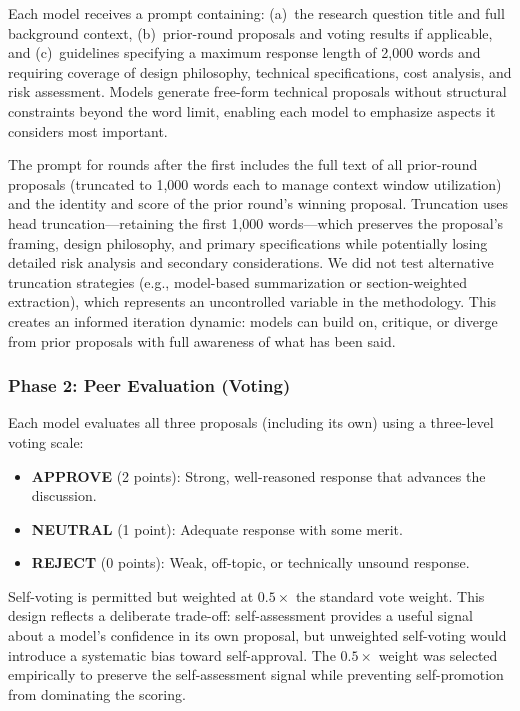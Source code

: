 \documentclass[11pt,a4paper]{article}
\begin{document}
Each model receives a prompt containing: (a)~the research question title and full background context, (b)~prior-round proposals and voting results if applicable, and (c)~guidelines specifying a maximum response length of 2{,}000 words and requiring coverage of design philosophy, technical specifications, cost analysis, and risk assessment. Models generate free-form technical proposals without structural constraints beyond the word limit, enabling each model to emphasize aspects it considers most important.

The prompt for rounds after the first includes the full text of all prior-round proposals (truncated to 1{,}000 words each to manage context window utilization) and the identity and score of the prior round's winning proposal. Truncation uses head truncation---retaining the first 1{,}000 words---which preserves the proposal's framing, design philosophy, and primary specifications while potentially losing detailed risk analysis and secondary considerations. We did not test alternative truncation strategies (e.g., model-based summarization or section-weighted extraction), which represents an uncontrolled variable in the methodology. This creates an informed iteration dynamic: models can build on, critique, or diverge from prior proposals with full awareness of what has been said.

\subsubsection{Phase 2: Peer Evaluation (Voting)}

Each model evaluates all three proposals (including its own) using a three-level voting scale:

\begin{itemize}[nosep]
    \item \textbf{APPROVE} (2 points): Strong, well-reasoned response that advances the discussion.
    \item \textbf{NEUTRAL} (1 point): Adequate response with some merit.
    \item \textbf{REJECT} (0 points): Weak, off-topic, or technically unsound response.
\end{itemize}

Self-voting is permitted but weighted at $0.5\times$ the standard vote weight. This design reflects a deliberate trade-off: self-assessment provides a useful signal about a model's confidence in its own proposal, but unweighted self-voting would introduce a systematic bias toward self-approval. The $0.5\times$ weight was selected empirically to preserve the self-assessment signal while preventing self-promotion from dominating the scoring.
\end{document}
